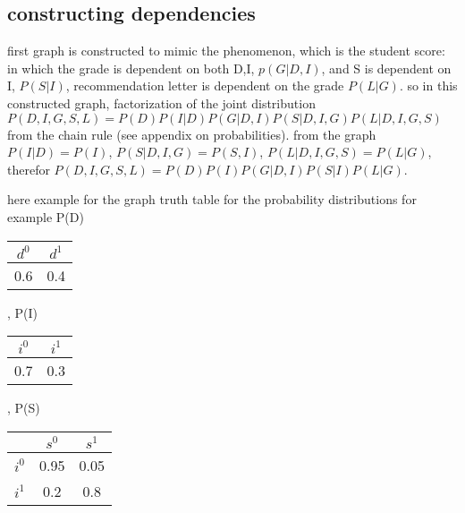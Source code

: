 \documentclass[4apaper,12pt]{book}
\begin{document}
\begin{description}
\begin{description}
      \subsection{constructing dependencies}
      \begin{description}
      \item  {}
      \item first graph is constructed to mimic the phenomenon, which is the student score: in which the grade is dependent on both D,I, $p(G|D,I)$, and S is dependent on I, $P(S|I)$, recommendation letter is dependent on the grade $P(L|G)$. so in this constructed graph, factorization of the joint distribution $P(D,I,G,S,L)=P(D)P(I|D)P(G|D,I)P(S|D,I,G)P(L|D,I,G,S)$ from the chain rule (see appendix on probabilities). from the graph $P(I|D)=P(I)$, $P(S|D,I,G)=P(S,I)$, $P(L|D,I,G,S)=P(L|G)$, therefor $P(D,I,G,S,L)=P(D)P(I)P(G|D,I)P(S|I)P(L|G)$.
      \item here example for the graph truth table for the probability distributions for example P(D) \begin{tabular}{ |c|c| }
        \hline
        $d^0$ & $d^1$ \\
        \hline
        \hline
        0.6 & 0.4 \\
        \hline
      \end{tabular}, P(I) \begin{tabular} {|c|c| }
        \hline
        $i^0$ & $i^1$ \\
        \hline
        \hline
        0.7 & 0.3 \\
        \hline
      \end{tabular}, P(S) \begin{tabular} { |c|c|c| }
        \hline
        & $s^0$ & $s^1$ \\
        \hline
        \hline
        $i^0$ & 0.95 & 0.05 \\
        \hline
        $i^1$ & 0.2 & 0.8 \\

\end{tabular}
\end{description}
\end{description}
\end{description}
\end{document}

